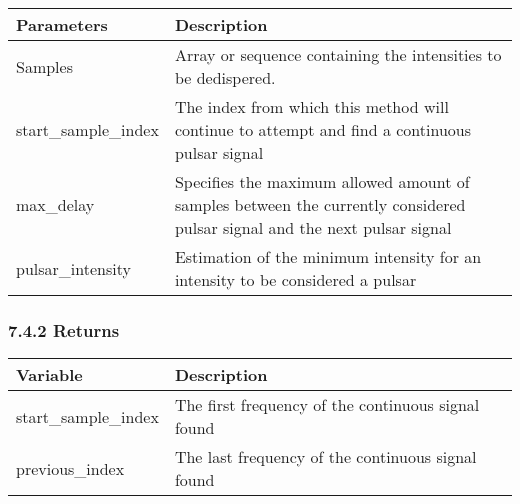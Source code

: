 \documentclass[]{article}
\begin{document}
\begin{longtable}[]{@{}ll@{}}
\toprule
\begin{minipage}[b]{0.41\columnwidth}\raggedright\strut
Parameters\strut
\end{minipage} & \begin{minipage}[b]{0.41\columnwidth}\raggedright\strut
Description\strut
\end{minipage}\tabularnewline
\midrule
\endhead
\begin{minipage}[t]{0.41\columnwidth}\raggedright\strut
Samples\strut
\end{minipage} & \begin{minipage}[t]{0.41\columnwidth}\raggedright\strut
Array or sequence containing the intensities to be dedispered.\strut
\end{minipage}\tabularnewline
\begin{minipage}[t]{0.41\columnwidth}\raggedright\strut
start\_sample\_index\strut
\end{minipage} & \begin{minipage}[t]{0.41\columnwidth}\raggedright\strut
The index from which this method will continue to attempt and find a
continuous pulsar signal\strut
\end{minipage}\tabularnewline
\begin{minipage}[t]{0.41\columnwidth}\raggedright\strut
max\_delay\strut
\end{minipage} & \begin{minipage}[t]{0.41\columnwidth}\raggedright\strut
Specifies the maximum allowed amount of samples between the currently
considered pulsar signal and the next pulsar signal\strut
\end{minipage}\tabularnewline
\begin{minipage}[t]{0.41\columnwidth}\raggedright\strut
pulsar\_intensity\strut
\end{minipage} & \begin{minipage}[t]{0.41\columnwidth}\raggedright\strut
Estimation of the minimum intensity for an intensity to be considered a
pulsar\strut
\end{minipage}\tabularnewline
\bottomrule
\end{longtable}

\subsubsection{7.4.2 Returns}\label{returns-3}

\begin{longtable}[]{@{}ll@{}}
\toprule
Variable & Description\tabularnewline
\midrule
\endhead
start\_sample\_index & The first frequency of the continuous signal
found\tabularnewline
previous\_index & The last frequency of the continuous signal
found\tabularnewline
\bottomrule
\end{longtable}
\end{document}
